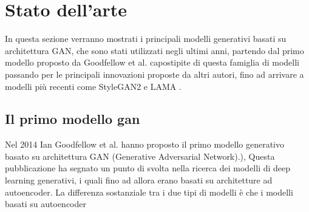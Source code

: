 \chapter{Stato dell'arte}
\begin{comment}
Cosa devo mettere in questa sezione??

- L'obbiettivo è arrivare a parlare del modello LAMA e stylegan2, quindi effetturò una serie di passaggi per passare dai primi modelli gan generativi
(goodfellow2014generative) a quelli più recenti come stylegan2 (karras2019analyzing), che erano i più utilizzati per generare immagini di alta qualità fino a poco tempo fa.
Per poi passare per pix2pix per introdurre le reti generative condizionate, e quindi dopo una breve introduzione al problema dell'inpainting arrivare a parlare di LAMA.
\end{comment}

In questa sezione verranno mostrati i principali modelli generativi basati su architettura GAN, che sono stati utilizzati negli ultimi anni, partendo dal 
primo modello proposto da Goodfellow et al. \cite{goodfellow2014generative} capostipite di questa famiglia di modelli passando per le principali innovazioni
proposte da altri autori, fino ad arrivare a modelli più recenti come StyleGAN2 \cite{karras2020analyzing} e LAMA \cite{suvorov2021resolutionrobust}.

\section{Il primo modello gan}
Nel 2014 Ian Goodfellow et al. \cite{goodfellow2014generative} hanno proposto il primo modello generativo basato su architettura GAN (Generative Adversarial Network).),
Questa pubblicazione ha segnato un punto di svolta nella ricerca dei modelli di deep learning generativi, i quali fino ad allora erano
basati su architetture ad autoencoder. La differenza sostanziale tra i due tipi di modelli è che i modelli basati su autoencoder 
